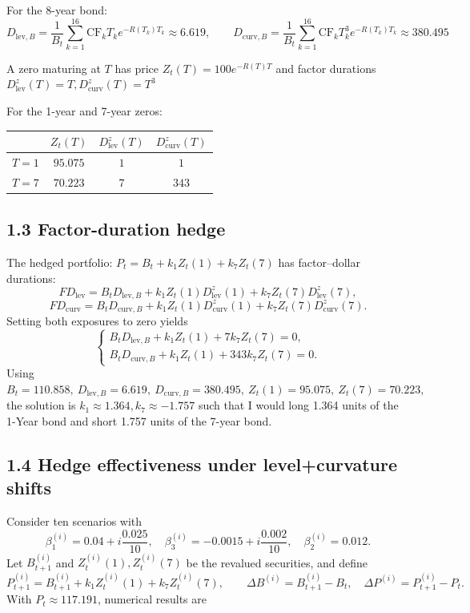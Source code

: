 For the 8-year bond:
\[
D_{\text{lev},B}
=\frac{1}{B_t}\sum_{k=1}^{16}\text{CF}_k T_k e^{-R(T_k)T_k}\approx \boxed{\text{6.619}},\qquad
D_{\text{curv},B}
=\frac{1}{B_t}\sum_{k=1}^{16}\text{CF}_k T_k^3 e^{-R(T_k)T_k}\approx \boxed{\text{380.495}}
\]

A zero maturing at \(T\) has price \(Z_t(T)=100e^{-R(T)T}\) and factor durations
$
D_{\text{lev}}^{z}(T)=T, D_{\text{curv}}^{z}(T)=T^3
$

For the 1-year and 7-year zeros:
\begin{center}
\begin{tabular}{c c c c}
 & $Z_t(T)$ & $D_{\text{lev}}^{z}(T)$ & $D_{\text{curv}}^{z}(T)$ \\ \hline
$T=1$ & $95.075$ & $1$   & $1$ \\
$T=7$ & $70.223$ & $7$   & $343$ \\
\end{tabular}
\end{center}

\subsection*{1.3 \quad Factor-duration hedge}

The hedged portfolio:
$
P_t = B_t + k_1 Z_t(1) + k_7 Z_t(7)
$
has factor–dollar durations:
\[
FD_{\text{lev}}
= B_t D_{\text{lev},B}
+ k_1 Z_t(1) D_{\text{lev}}^{z}(1)
+ k_7 Z_t(7) D_{\text{lev}}^{z}(7),
\]
\[
FD_{\text{curv}}
= B_t D_{\text{curv},B}
+ k_1 Z_t(1) D_{\text{curv}}^{z}(1)
+ k_7 Z_t(7) D_{\text{curv}}^{z}(7).
\]
Setting both exposures to zero yields
\[
\begin{cases}
B_t D_{\text{lev},B} + k_1 Z_t(1) + 7k_7 Z_t(7)=0,\\
B_t D_{\text{curv},B} + k_1 Z_t(1) + 343k_7 Z_t(7)=0.
\end{cases}
\]
Using
$
B_t=110.858,\ D_{\text{lev},B}=6.619,\ D_{\text{curv},B}=380.495,\ 
Z_t(1)=95.075,\ Z_t(7)=70.223,
$
the solution is $
\boxed{k_1\approx 1.364, k_7\approx -1.757}
$ such that I would long 1.364 units of the 1-Year bond and short 1.757 units of the 7-year bond.

\subsection*{1.4 \quad Hedge effectiveness under level+curvature shifts}

Consider ten scenarios with
\[
\beta_1^{(i)}=0.04+i\frac{0.025}{10},\quad
\beta_3^{(i)}=-0.0015+i\frac{0.002}{10},\quad
\beta_2^{(i)}=0.012.
\]
Let \(B_{t+1}^{(i)}\) and \(Z_t^{(i)}(1),Z_t^{(i)}(7)\) be the revalued securities, and define
\[
P_{t+1}^{(i)}=B_{t+1}^{(i)}+k_1 Z_t^{(i)}(1)+k_7 Z_t^{(i)}(7),\qquad
\Delta B^{(i)}=B_{t+1}^{(i)}-B_t,\quad
\Delta P^{(i)}=P_{t+1}^{(i)}-P_t.
\]
With \(P_t\approx 117.191\), numerical results are

